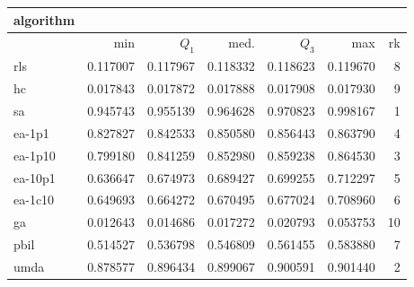 \begin{tabular}{@{}l*{5}{>{{}}N{1}{3}}>{{}}N{2}{0}@{}}
\toprule
{algorithm} &  \\
\midrule
& {min} & {$Q_1$} & {med.} & {$Q_3$} & {max} & {rk}\\
\midrule
rls & 0.117007 & 0.117967 & 0.118332 & 0.118623 & 0.119670 & 8\\
hc & 0.017843 & 0.017872 & 0.017888 & 0.017908 & 0.017930 & 9\\
sa & {\color{blue}} 0.945743 & {\color{blue}} 0.955139 & {\color{blue}} 0.964628 & {\color{blue}} 0.970823 & {\color{blue}} 0.998167 & 1\\
ea-1p1 & 0.827827 & 0.842533 & 0.850580 & 0.856443 & 0.863790 & 4\\
ea-1p10 & 0.799180 & 0.841259 & 0.852980 & 0.859238 & 0.864530 & 3\\
ea-10p1 & 0.636647 & 0.674973 & 0.689427 & 0.699255 & 0.712297 & 5\\
ea-1c10 & 0.649693 & 0.664272 & 0.670495 & 0.677024 & 0.708960 & 6\\
ga & 0.012643 & 0.014686 & 0.017272 & 0.020793 & 0.053753 & 10\\
pbil & 0.514527 & 0.536798 & 0.546809 & 0.561455 & 0.583880 & 7\\
umda & 0.878577 & 0.896434 & 0.899067 & 0.900591 & 0.901440 & 2\\
\bottomrule
\end{tabular}
